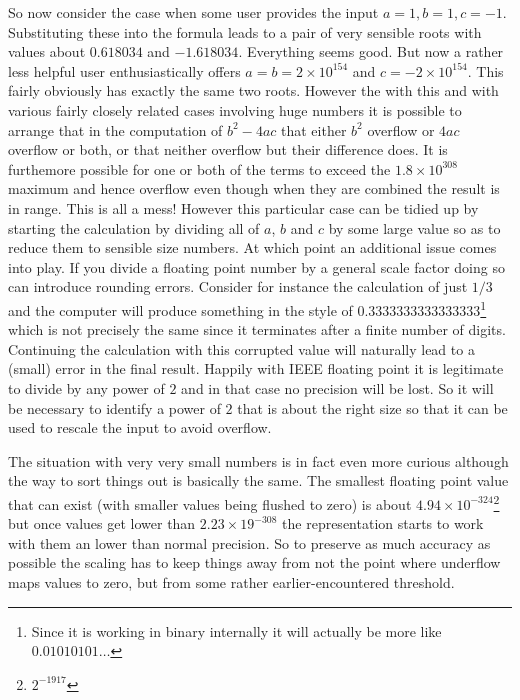 So now consider the case when some user provides the input
$a=1, b=1, c=-1$. Substituting these into the formula leads to
a pair of very sensible roots with values about $0.618034$ and
$-1.618034$. Everything seems good. But now a rather less helpful
user enthusiastically offers $a=b=2 \times 10^{154}$ and
$c=-2 \times 10^{154}$. This fairly obviously has exactly the same
two roots. However the with this and with various fairly closely related
cases involving huge numbers it is possible to arrange that in the
computation of $b^2 - 4 a c$ that either $b^2$ overflow or $4 a c$
overflow or both, or that neither overflow but their difference does.
It is furthemore possible for one or both of the terms to exceed the
$1.8 \times 10^{308}$ maximum and hence overflow even though when they
are combined the result is in range. This is all a mess! However
this particular case can be tidied up by starting the calculation by
dividing all of $a$, $b$ and $c$ by some large value so as to reduce them
to sensible size numbers. At which point an additional issue comes into
play. If you divide a floating point number by a general scale factor
doing so can introduce rounding errors. Consider for instance the
calculation of just $1/3$ and the computer will produce something
in the style of $0.3333333333333333$\footnote{Since it is working in binary
internally it will actually be more like $0.01010101\ldots$} which is
not precisely the same since it terminates after a finite number of
digits. Continuing the calculation with this corrupted value will
naturally lead to a (small) error in the final result. Happily with
IEEE floating point it is legitimate to divide by any power of $2$ and
in that case no precision will be lost. So it will be necessary to
identify a power of $2$ that is about the right size so that it can be used
to rescale the input to avoid overflow.

The situation with very very small numbers is in fact even more curious
although the way to sort things out is basically the same. The smallest
floating point value that can exist (with smaller values being flushed
to zero) is about $4.94\times 10^{-324}$\footnote{$2^{-1917}$} but once
values get lower than $2.23 \times 19^{-308}$ the representation starts to
work with them an lower than normal precision. So to preserve as
much accuracy as possible the scaling has to keep things away from not the
point where underflow maps values to zero, but from some rather
earlier-encountered threshold.

